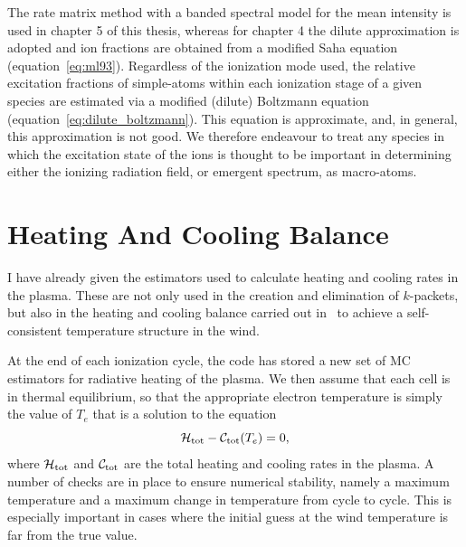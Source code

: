 The rate matrix method with a banded spectral model for the mean intensity is used
in chapter 5 of this thesis, whereas for chapter 4 the dilute approximation is adopted
and ion fractions are obtained from a modified Saha equation (equation~\ref{eq:ml93}).
Regardless of the ionization mode used, the relative excitation fractions of simple-atoms
within each ionization stage of a given species are 
estimated via a modified (dilute) Boltzmann
equation (equation~\ref{eq:dilute_boltzmann}). This equation is approximate, and, in 
general, this approximation is not good. We therefore endeavour to treat any species in
which the excitation state of the ions is thought to be important
in determining either the ionizing radiation field, or emergent spectrum,
as macro-atoms.


\section{Heating And Cooling Balance}
\label{sec:heating_cooling}
I have already given the estimators used to calculate
heating and cooling rates in the plasma. These are not only used
in the creation and elimination of $k$-packets, but also in the heating
and cooling balance carried out in \py\ to achieve a self-consistent
temperature structure in the wind. 

At the end of each ionization cycle, the code has stored a new set
of MC estimators for radiative heating of the plasma. We then
assume that each cell is in thermal equilibrium, so that the appropriate
electron temperature is simply the value of $T_e$ that is a solution
to the equation
\begin{equation}
{\cal H}_{\mathrm{tot}} - {\cal C}_{\mathrm{tot}} ( T_e) = 0,
\end{equation}
where ${\cal H}_{\mathrm{tot}}$ and ${\cal C}_{\mathrm{tot}}$ are the total heating and cooling rates in 
the plasma. A number of checks are in place to ensure numerical stability,
namely a maximum temperature and a maximum change in temperature from cycle
to cycle. This is especially important in cases where the initial
guess at the wind temperature is far from the true value.

